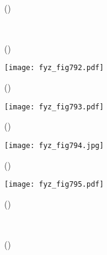     \begin{figure}[ht!]
      \centering
                     \\
      \label{fyz:fig790}
      \caption{
               (\cite[s.~748]{Feynman02})}
    \end{figure}

    \begin{figure}[ht!]
      \centering
                     \\
      \label{fyz:fig791}
      \caption{
               (\cite[s.~748]{Feynman02})}
    \end{figure}

    \begin{figure}[ht!] %
      \centering
      \texttt{[image: fyz\_fig792.pdf]}
      \caption{
               (\cite[s.~707]{Feynman02})}
      \label{fyz:fig792}
    \end{figure}

    \begin{figure}[ht!] %
      \centering
      \texttt{[image: fyz\_fig793.pdf]}
      \caption{
               (\cite[s.~707]{Feynman02})}
      \label{fyz:fig793}
    \end{figure}

    \begin{figure}[ht!] %
      \centering
      \texttt{[image: fyz\_fig794.jpg]}
      \caption{
               (\cite[s.~707]{Feynman02})}
      \label{fyz:fig794}
    \end{figure}

    \begin{figure}[ht!] %
      \centering
      \texttt{[image: fyz\_fig795.pdf]}
      \caption{
               (\cite[s.~707]{Feynman02})}
      \label{fyz:fig795}
    \end{figure}

    \begin{figure}[ht!]
      \centering
                     \\
      \label{fyz:fig796}
      \caption{
               (\cite[s.~748]{Feynman02})}
    \end{figure}


